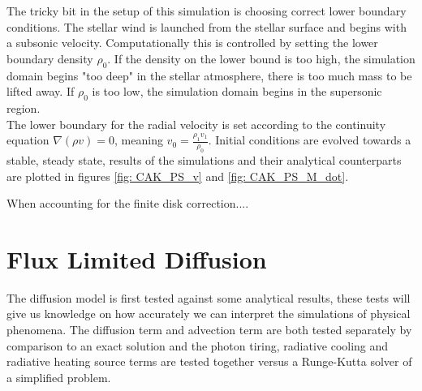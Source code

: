 The tricky bit in the setup of this simulation is choosing correct lower boundary conditions. The stellar wind is launched from the stellar surface and begins with a subsonic velocity. Computationally this is controlled by setting the lower boundary density $\rho_0$. If the density on the lower bound is too high, the simulation domain begins "too deep" in the stellar atmosphere, there is too much mass to be lifted away. If $\rho_0$ is too low, the simulation domain begins in the supersonic region.\\
The lower boundary for the radial velocity is set according to the continuity equation $\nabla (\rho v) = 0$, meaning $v_0 = \frac{\rho_1 v_1}{\rho_0}$. Initial conditions are evolved towards a stable, steady state, results of the simulations and their analytical counterparts are plotted in figures \ref{fig: CAK_PS_v} and \ref{fig: CAK_PS_M_dot}.

%

When accounting for the finite disk correction....

\section{Flux Limited Diffusion}
The diffusion model is first tested against some analytical results, these tests will give us knowledge on how accurately we can interpret the simulations of physical phenomena. The diffusion term and advection term are both tested separately by comparison to an exact solution and the photon tiring, radiative cooling and radiative heating source terms are tested together versus a Runge-Kutta solver of a simplified problem.

